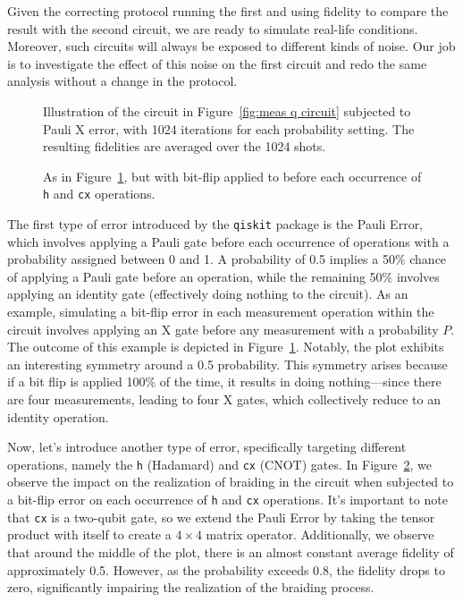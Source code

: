 \documentclass{article}
\def\c#1{\texttt{#1}}
\begin{document}
\vspace{12pt}
Given the correcting protocol running the first and using fidelity to compare the result with the second circuit, we are ready to simulate real-life conditions. Moreover, such circuits will always be exposed to different kinds of noise. Our job is to investigate the effect of this noise on the first circuit and redo the same analysis without a change in the protocol.
\begin{figure}
	\begin{center}
		
	\end{center}
	\caption{Illustration of the circuit in Figure~\ref{fig:meas q circuit} subjected to Pauli X error, with 1024 iterations for each probability setting. The resulting fidelities are averaged over the 1024 shots.}\label{fig:with bit flip error}
\end{figure}
\begin{figure}
	\begin{center}
		
	\end{center}
	\caption{As in Figure~\ref{fig:with bit flip error}, but with bit-flip applied to before each occurrence of \c{h} and \c{cx} operations.}\label{fig:bit flip error on cx}
\end{figure}
The first type of error introduced by the \c{qiskit} package is the Pauli Error, which involves applying a Pauli gate before each occurrence of operations with a probability assigned between 0 and 1. A probability of 0.5 implies a 50\% chance of applying a Pauli gate before an operation, while the remaining 50\% involves applying an identity gate (effectively doing nothing to the circuit). As an example, simulating a bit-flip error in each measurement operation within the circuit involves applying an X gate before any measurement with a probability \( P \). The outcome of this example is depicted in Figure~\ref{fig:with bit flip error}. Notably, the plot exhibits an interesting symmetry around a 0.5 probability. This symmetry arises because if a bit flip is applied 100\% of the time, it results in doing nothing—since there are four measurements, leading to four X gates, which collectively reduce to an identity operation.

Now, let's introduce another type of error, specifically targeting different operations, namely the \c{h} (Hadamard) and \c{cx} (CNOT) gates. In Figure~\ref{fig:bit flip error on cx}, we observe the impact on the realization of braiding in the circuit when subjected to a bit-flip error on each occurrence of \c{h} and \c{cx} operations. It's important to note that \c{cx} is a two-qubit gate, so we extend the Pauli Error by taking the tensor product with itself to create a \(4 \times 4\) matrix operator. Additionally, we observe that around the middle of the plot, there is an almost constant average fidelity of approximately 0.5. However, as the probability exceeds 0.8, the fidelity drops to zero, significantly impairing the realization of the braiding process.
\end{document}

